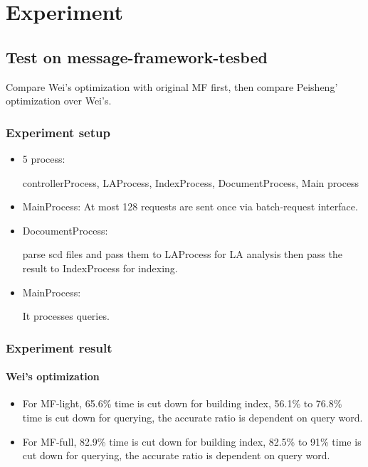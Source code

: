 \documentclass[a4paper,10pt]{article}
\begin{document}
\section{Experiment}

\subsection{Test on message-framework-tesbed}
Compare Wei's optimization with original MF first, then compare Peisheng' optimization over Wei's.

\subsubsection{Experiment setup}
\begin{itemize}
\item 5 process:

 controllerProcess,  LAProcess, IndexProcess, DocumentProcess, Main process

\item MainProcess:  At most 128 requests are sent once via batch-request interface.

\item DocoumentProcess:

parse scd files and pass them  to LAProcess  for LA analysis
then pass the result to IndexProcess for indexing.

\item MainProcess:

It processes  queries.

\end{itemize}


\subsubsection{Experiment result}

\paragraph{Wei's optimization}

\begin{itemize}

\item For MF-light, 65.6\% time is cut down for building index, 56.1\% to 76.8\% time is cut down for querying, the accurate ratio is dependent on query word.

\item For MF-full, 82.9\% time is cut down for building index, 82.5\% to 91\% time is cut down for querying, the accurate ratio is dependent on query word.

\end{itemize}
\end{document}
